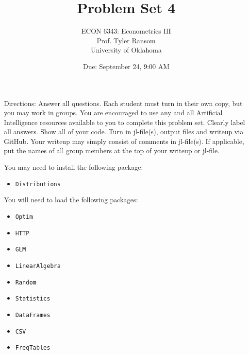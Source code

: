\documentclass[12pt,english]{article}
\begin{document}
\title{Problem Set 4}
\author{ECON 6343: Econometrics III\\
Prof. Tyler Ransom\\
University of Oklahoma}
\date{Due: September 24, 9:00 AM}

\maketitle
Directions: Answer all questions. Each student must turn in their own copy, but you may work in groups. You are encouraged to use any and all Artificial Intelligence resources available to you to complete this problem set. Clearly label all answers. Show all of your code. Turn in jl-file(s), output files and writeup via GitHub. Your writeup may simply consist of comments in jl-file(s). If applicable, put the names of all group members at the top of your writeup or jl-file.

You may need to install the following package:
\begin{itemize}
    \item[~] \texttt{Distributions}
\end{itemize}

You will need to load the following packages:
\begin{itemize}
    \item[~] \texttt{Optim} 
    \item[~] \texttt{HTTP} 
    \item[~] \texttt{GLM} 
    \item[~] \texttt{LinearAlgebra} 
    \item[~] \texttt{Random} 
    \item[~] \texttt{Statistics} 
    \item[~] \texttt{DataFrames} 
    \item[~] \texttt{CSV} 
    \item[~] \texttt{FreqTables}
\end{itemize}
\end{document}
